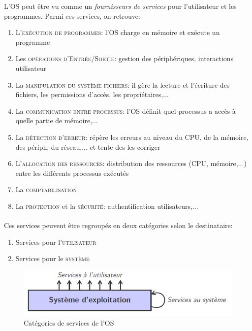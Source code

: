 \item{}
{
L'OS peut être vu comme un \textit{fournisseurs de services} pour l'utilisateur et les programmes. Parmi ces services, on retrouve:
\begin{enumerate}
\item L'\textcolor{ltred}{\textsc{exécution de programmes}}: l'OS charge en mémoire et exécute un programme
\item Les \textcolor{ltred}{\textsc{opérations d'Entrée/Sortie}}: gestion des périphériques, interactions utilisateur
\item La \textcolor{ltred}{\textsc{manipulation du système fichiers}}: il gère la lecture et l'écriture des fichiers, les permissions d'accès, les propriétaires,...
\item La \textcolor{ltred}{\textsc{communication entre processus}}: l'OS définit quel processus a accès à quelle partie de mémoire,...
\item La \textcolor{ltred}{\textsc{détection d'erreur}}: répère les erreurs au niveau du CPU, de la mémoire, des périph, du réseau,... et tente des les corriger
\item L'\textcolor{ltred}{\textsc{allocation des ressources}}: distribution des ressources (CPU, mémoire,...) entre les différents processus exécutés
\item La \textcolor{ltred}{\textsc{comptabilisation}}
\item La \textcolor{ltred}{\textsc{protection}} et la \textcolor{ltred}{\textsc{sécurité}}: authentification utilisateurs,...
\end{enumerate}

\paragraph{}
Ces services peuvent être regroupés en deux catégories selon le destinataire:
\begin{enumerate}
\item Services pour l'\textsc{utilisateur}
\item Services pour le \textsc{système}
\end{enumerate}

\begin{figure}[h!]
\center
\includegraphics[scale=.5]{images/types-services}
\caption{Catégories de services de l'OS}
\end{figure}

}
